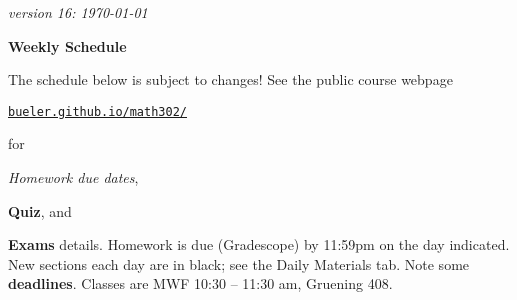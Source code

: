 \documentclass[12pt]{article}
\newcommand{\due}[1]{\strut {\color{BrickRed} \textsl{#1}}}
\newcommand{\ee}[1]{\strut {\color{Blue} \textbf{#1}}}
\newcommand{\dlinline}[1]{{\color{Purple} \textbf{#1}}}
\newcommand{\dl}[1]{{\small \dlinline{#1}}}
\begin{document}
\hfill \small \emph{version 16: \today} \normalsize

\bigskip\bigskip
\centerline{\Large \textbf{Weekly Schedule}}

\bigskip
The schedule below is subject to changes!  See the public course webpage

\medskip

\centerline{\href{https://bueler.github.io/math302/index.html}{\texttt{bueler.github.io/math302/}}}

\noindent for \due{Homework due dates}, \ee{Quiz}, and \ee{Exams} details.  Homework is due (Gradescope) by 11:59pm on the day indicated.  New sections each day are in black; see the Daily Materials tab.  Note some \dl{deadlines}.  Classes are MWF 10:30 -- 11:30 am, Gruening 408.

\bigskip
\end{document}
